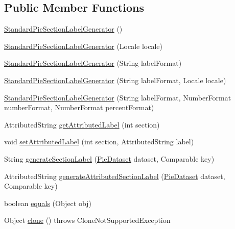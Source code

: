 \subsection*{Public Member Functions}
\begin{DoxyCompactItemize}
\item 
\mbox{\hyperlink{classorg_1_1jfree_1_1chart_1_1labels_1_1_standard_pie_section_label_generator_a396c181748014a114419deaa22ebde92}{Standard\+Pie\+Section\+Label\+Generator}} ()
\item 
\mbox{\hyperlink{classorg_1_1jfree_1_1chart_1_1labels_1_1_standard_pie_section_label_generator_a4c00d2aa3e629c8cd4487291e9096f57}{Standard\+Pie\+Section\+Label\+Generator}} (Locale locale)
\item 
\mbox{\hyperlink{classorg_1_1jfree_1_1chart_1_1labels_1_1_standard_pie_section_label_generator_a975824217e5f1db7553c3f0efc062fa9}{Standard\+Pie\+Section\+Label\+Generator}} (String label\+Format)
\item 
\mbox{\hyperlink{classorg_1_1jfree_1_1chart_1_1labels_1_1_standard_pie_section_label_generator_a423b600ec04b0c45da8f39b4f3b854fd}{Standard\+Pie\+Section\+Label\+Generator}} (String label\+Format, Locale locale)
\item 
\mbox{\hyperlink{classorg_1_1jfree_1_1chart_1_1labels_1_1_standard_pie_section_label_generator_a26463e65d0fa9fd2980cca2ce110d3c4}{Standard\+Pie\+Section\+Label\+Generator}} (String label\+Format, Number\+Format number\+Format, Number\+Format percent\+Format)
\item 
Attributed\+String \mbox{\hyperlink{classorg_1_1jfree_1_1chart_1_1labels_1_1_standard_pie_section_label_generator_ad53325d20bd03f6c19cb2dec97b36b29}{get\+Attributed\+Label}} (int section)
\item 
void \mbox{\hyperlink{classorg_1_1jfree_1_1chart_1_1labels_1_1_standard_pie_section_label_generator_a6aa94eabd64ee4652031696b0a3c5797}{set\+Attributed\+Label}} (int section, Attributed\+String label)
\item 
String \mbox{\hyperlink{classorg_1_1jfree_1_1chart_1_1labels_1_1_standard_pie_section_label_generator_a043e8cf227d2d5f5a457219ec6769488}{generate\+Section\+Label}} (\mbox{\hyperlink{interfaceorg_1_1jfree_1_1data_1_1general_1_1_pie_dataset}{Pie\+Dataset}} dataset, Comparable key)
\item 
Attributed\+String \mbox{\hyperlink{classorg_1_1jfree_1_1chart_1_1labels_1_1_standard_pie_section_label_generator_a77c817699c799f3112e7ed696bae25d5}{generate\+Attributed\+Section\+Label}} (\mbox{\hyperlink{interfaceorg_1_1jfree_1_1data_1_1general_1_1_pie_dataset}{Pie\+Dataset}} dataset, Comparable key)
\item 
boolean \mbox{\hyperlink{classorg_1_1jfree_1_1chart_1_1labels_1_1_standard_pie_section_label_generator_a35a182df1a7b80769f68c7142b46b970}{equals}} (Object obj)
\item 
Object \mbox{\hyperlink{classorg_1_1jfree_1_1chart_1_1labels_1_1_standard_pie_section_label_generator_a5be89383f354a39b7364b5d3ed02718e}{clone}} ()  throws Clone\+Not\+Supported\+Exception 
\end{DoxyCompactItemize}
